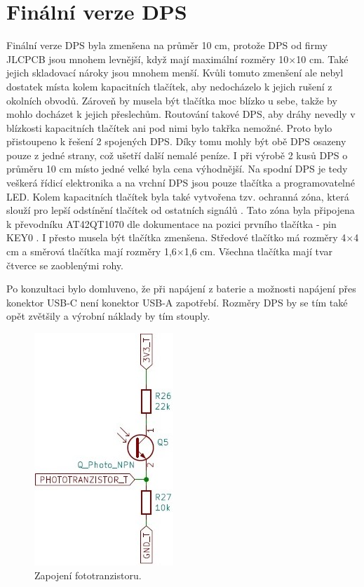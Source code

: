 \chapter{Finální verze DPS}
Finální verze DPS byla zmenšena na průměr 10 cm, protože DPS od firmy JLCPCB jsou mnohem levnější, když mají maximální rozměry 10$\times$10 cm. Také jejich skladovací nároky jsou mnohem  menší. 
Kvůli tomuto zmenšení ale nebyl dostatek místa 
kolem kapacitních tlačítek, aby nedocházelo k jejich rušení z okolních obvodů. Zároveň by musela být tlačítka moc blízko u sebe, takže by mohlo docházet k jejich přeslechům. Routování takové 
DPS, aby dráhy nevedly v blízkosti kapacitních tlačítek ani pod nimi bylo takřka nemožné. Proto bylo přistoupeno k řešení 2 spojených DPS. Díky tomu mohly být obě DPS osazeny pouze z jedné strany,
což ušetří další nemalé peníze. I při výrobě 2 kusů DPS o průměru 10 cm místo jedné velké byla cena výhodnější. Na spodní DPS je tedy veškerá řídicí elektronika a na vrchní DPS jsou pouze tlačítka 
a programovatelné LED. Kolem kapacitních tlačítek byla také vytvořena tzv. ochranná zóna, která slouží pro lepší odstínění tlačítek od ostatních signálů \cite{conv_cap_but_AT42QT1070_dtsh}. Tato zóna 
byla připojena k převodníku AT42QT1070 dle dokumentace na pozici prvního tlačítka - pin KEY0 \cite{conv_cap_but_AT42QT1070_dtsh}. I přesto musela být tlačítka zmenšena. Středové tlačítko má rozměry 
4$\times$4 cm a směrová tlačítka mají rozměry 1,6$\times$1,6 cm. Všechna tlačítka mají tvar čtverce se zaoblenými rohy. 

Po konzultaci bylo domluveno, že při napájení z baterie a možnosti napájení přes konektor USB-C není konektor USB-A zapotřebí. Rozměry DPS by se tím také opět zvětšily a výrobní náklady by tím 
stouply. 

\begin{figure}[!h]
  \begin{center}
    \includegraphics[scale=0.7]{obrazky/fototranzistor.jpg}
  \end{center}
  \caption[Zapojení fototranzistoru]{Zapojení fototranzistoru.}
\end{figure}

